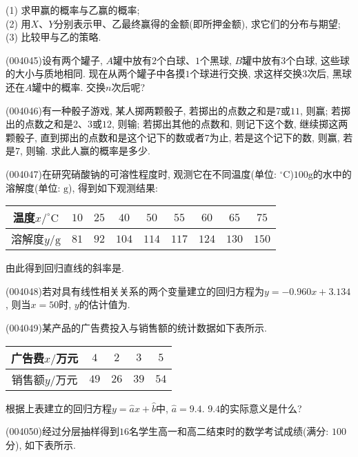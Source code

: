 (1) 求甲赢的概率与乙赢的概率;\\
(2) 用$X$、$Y$分别表示甲、乙最终赢得的金额(即所押金额), 求它们的分布与期望;\\
(3) 比较甲与乙的策略.
\item (004045)设有两个罐子, $A$罐中放有$2$个白球、$1$个黑球, $B$罐中放有$3$个白球, 这些球的大小与质地相同. 现在从两个罐子中各摸$1$个球进行交换, 求这样交换$3$次后, 黑球还在$A$罐中的概率. 交换$n$次后呢?
\item (004046)有一种骰子游戏, 某人掷两颗骰子, 若掷出的点数之和是$7$或$11$, 则赢; 若掷出的点数之和是$2$、$3$或$12$, 则输; 若掷出其他的点数和, 则记下这个数, 继续掷这两颗骰子, 直到掷出的点数和是这个记下的数或者$7$为止, 若是这个记下的数, 则赢, 若是$7$, 则输. 求此人赢的概率是多少.
\item (004047)在研究硝酸钠的可溶性程度时, 观测它在不同温度(单位: $^\circ\text{C}$)$100\text{g}$的水中的溶解度(单位: $\text{g}$), 得到如下观测结果:
\begin{center}
    \begin{tabular}{|c|c|c|c|c|c|c|c|c|}
        \hline
        温度$x/^\circ\text{C}$ & $10$ & $25$ & $40$ & $50$ & $55$ & $60$ & $65$ & $75$ \\ \hline
        溶解度$y/\text{g}$ & $81$ & $92$ & $104$ & $114$ & $117$ & $124$ & $130$ & $150$ \\ \hline
    \end{tabular}
\end{center}
由此得到回归直线的斜率是.
\item (004048)若对具有线性相关关系的两个变量建立的回归方程为$y=-0.960x+3.134$, 则当$x=50$时, $y$的估计值为.
\item (004049)某产品的广告费投入与销售额的统计数据如下表所示.
\begin{center}
    \begin{tabular}{|c|c|c|c|c|}
        \hline
        广告费$x/$万元 & $4$ & $2$ & $3$ & $5$ \\ \hline
        销售额$y/$万元 & $49$ & $26$ & $39$ & $54$ \\ \hline   
    \end{tabular}
\end{center}
根据上表建立的回归方程$y=\hat ax+\hat b$中, $\hat a=9.4$. $9.4$的实际意义是什么?
\item (004050)经过分层抽样得到$16$名学生高一和高二结束时的数学考试成绩(满分: $100$分), 如下表所示.
